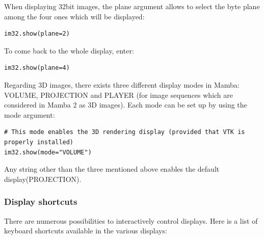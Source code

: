 \documentclass[a4paper,10pt,oneside]{article}
\begin{document}
When displaying 32bit images, the plane argument allows to select the byte plane among the
four ones which will be displayed:

\lstset{language=Python}
\begin{lstlisting}
im32.show(plane=2)
\end{lstlisting}

To come back to the whole display, enter:

\lstset{language=Python} 
\begin{lstlisting}
im32.show(plane=4)
\end{lstlisting}

Regarding 3D images, there exists three different display modes in Mamba: VOLUME, PROJECTION
and PLAYER (for image sequences which are considered in Mamba 2 as 3D images). Each mode can be set up
by using the mode argument:

\lstset{language=Python}
\begin{lstlisting}
# This mode enables the 3D rendering display (provided that VTK is properly installed)
im32.show(mode="VOLUME")
\end{lstlisting}

Any string other than the three mentioned above enables the default display(PROJECTION).

\subsubsection{Display shortcuts}
\label{cha:dis_shortcuts}

There are numerous possibilities to interactively control displays. Here is a list of
keyboard shortcuts available in the various displays:
\end{document}
